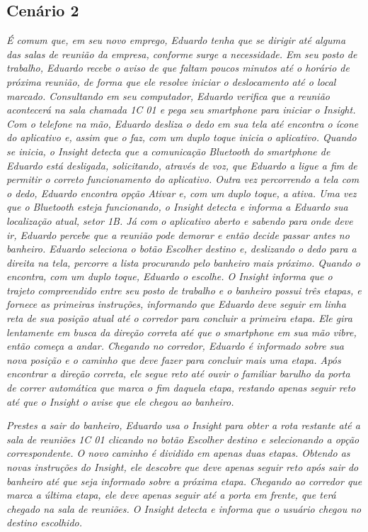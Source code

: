 \documentclass[twoside,english,brazilian]{UNISINOSartigo}
\begin{document}
\subsection{Cenário 2}
\textit{É comum que, em seu novo emprego, Eduardo tenha que se dirigir até alguma das salas de reunião da empresa, conforme surge a necessidade. Em seu posto de trabalho, Eduardo recebe o aviso de que faltam poucos minutos até o horário de próxima reunião, de forma que ele resolve iniciar o deslocamento até o local marcado. Consultando em seu computador, Eduardo verifica que a reunião acontecerá na sala chamada 1C 01 e pega seu smartphone para iniciar o Insight. Com o telefone na mão, Eduardo desliza o dedo em sua tela até encontra o ícone do aplicativo e, assim que o faz, com um duplo toque inicia o aplicativo. Quando se inicia, o Insight detecta que a comunicação Bluetooth do smartphone de Eduardo está desligada, solicitando, através de voz, que Eduardo a ligue a fim de permitir o correto funcionamento do aplicativo. Outra vez percorrendo a tela com o dedo, Eduardo encontra opção Ativar e, com um duplo toque, a ativa. Uma vez que o Bluetooth esteja funcionando, o Insight detecta e informa a Eduardo sua localização atual, setor 1B. Já com o aplicativo aberto e sabendo para onde deve ir, Eduardo percebe que a reunião pode demorar e então decide passar antes no banheiro. Eduardo seleciona o botão Escolher destino e, deslizando o dedo para a direita na tela, percorre a lista procurando pelo banheiro mais próximo. Quando o encontra, com um duplo toque, Eduardo o escolhe. O Insight informa que o trajeto compreendido entre seu posto de trabalho e o banheiro possui três etapas, e fornece as primeiras instruções, informando que Eduardo deve seguir em linha reta de sua posição atual até o corredor para concluir a primeira etapa. Ele gira lentamente em busca da direção correta até que o smartphone em sua mão vibre, então começa a andar. Chegando no corredor, Eduardo é informado sobre sua nova posição e o caminho que deve fazer para concluir mais uma etapa. Após encontrar a direção correta, ele segue reto até ouvir o familiar barulho da porta de correr automática que marca o fim daquela etapa, restando apenas seguir reto até que o Insight o avise que ele chegou ao banheiro.}

\textit{Prestes a sair do banheiro, Eduardo usa o Insight para obter a rota restante até a sala de reuniões 1C 01 clicando no botão Escolher destino e selecionando a opção correspondente. O novo caminho é dividido em apenas duas etapas. Obtendo as novas instruções do Insight, ele descobre que deve apenas seguir reto após sair do banheiro até que seja informado sobre a próxima etapa. Chegando ao corredor que marca a última etapa, ele deve apenas seguir até a porta em frente, que terá chegado na sala de reuniões. O Insight detecta e informa que o usuário chegou no destino escolhido.}
\end{document}
